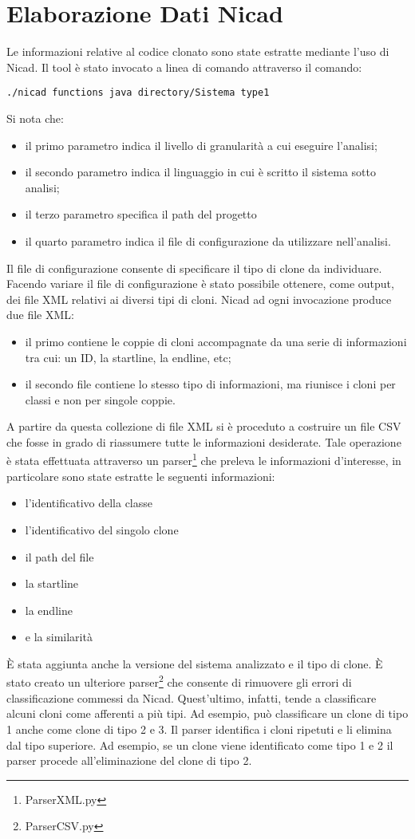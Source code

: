 \section{Elaborazione Dati Nicad}
Le informazioni relative al codice clonato sono state estratte mediante l'uso di Nicad. Il tool è stato invocato a linea di comando attraverso il comando:
\begin{verbatim}
./nicad functions java directory/Sistema type1
\end{verbatim}
Si nota che:
\begin{itemize}
	\item il primo parametro indica il livello di granularità a cui eseguire l'analisi;
	\item il secondo parametro indica il linguaggio in cui è scritto il sistema sotto analisi;
	\item il terzo parametro specifica il path del progetto
	\item il quarto parametro indica il file di configurazione da utilizzare nell'analisi.
\end{itemize}
Il file di configurazione consente di specificare il tipo di clone da individuare. Facendo variare il file di configurazione è stato possibile ottenere, come output, dei file XML relativi ai diversi tipi di cloni. Nicad ad ogni invocazione produce due file XML:
\begin{itemize}
	\item il primo contiene le coppie di cloni accompagnate da una serie di informazioni tra cui: un ID, la startline, la endline, etc;
	\item il secondo file contiene lo stesso tipo di informazioni, ma riunisce i cloni per classi e non per singole coppie.
\end{itemize}
A partire da questa collezione di file XML si è proceduto a costruire un file CSV che fosse in grado di riassumere tutte le informazioni desiderate. Tale operazione è stata effettuata attraverso un parser\footnote{ParserXML.py} che preleva le informazioni d'interesse, in particolare sono state estratte le seguenti informazioni:
\begin{itemize}
\item l'identificativo della classe
\item l'identificativo del singolo clone
\item il path del file
\item la startline
\item la endline
\item e la similarità
\end{itemize} 
È stata aggiunta anche la versione del sistema analizzato e il tipo di clone. 
È stato creato un ulteriore parser\footnote{ParserCSV.py} che consente di rimuovere gli errori di classificazione commessi da Nicad. Quest'ultimo, infatti, tende a classificare alcuni cloni come afferenti a più tipi. Ad esempio, può classificare un clone di tipo 1 anche come clone di tipo 2 e 3. Il parser identifica i cloni ripetuti e li elimina dal tipo superiore. Ad esempio, se un clone viene identificato come tipo 1 e 2 il parser procede all'eliminazione del clone di tipo 2.